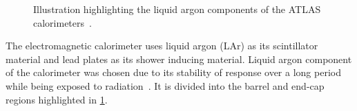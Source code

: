 \begin{figure}
    \centering
    \caption[Illustration highlighting the liquid argon components of the ATLAS calorimeters]{Illustration highlighting the liquid argon components of the ATLAS calorimeters~\cite{ATLASLarImage}.}
    \label{fig:method:ATLAS:LAr}
\end{figure}

The electromagnetic calorimeter uses liquid argon (LAr) as its scintillator material and lead plates as its shower inducing material. Liquid argon component of the calorimeter was chosen due to its stability of response over a long period while being exposed to radiation~\cite{ATLAS:LAr-TDR}. It is divided into the barrel and end-cap regions highlighted in \cref{fig:method:ATLAS:LAr}. 

